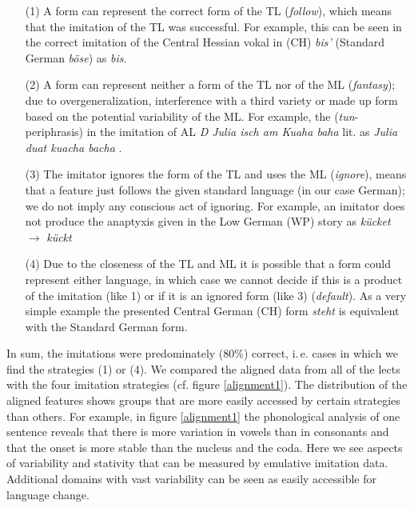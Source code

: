 \documentclass[output=paper]{LSP/langsci}
\begin{document}
\begin{itemize}
\item [(1)] A form can represent the correct form of the TL (\textit{follow}), which means that the imitation of the TL was successful.
 For example, this can be seen in the correct imitation of the Central Hessian vokal in (CH) \textit{bis’} (Standard German \textit{b\"ose})  as \textit{bis}.
 \item [(2)]  A form can represent neither a form of the TL nor of the ML (\textit{fantasy}); due to overgeneralization, interference with a third variety or made up form based on the potential variability of the ML. 
 For example, the  (\textit{tun}-periphrasis) in the imitation of AL \textit{D Julia isch am Kuaha baha} lit.  as \textit{Julia duat kuacha bacha} . 
  \item [(3)] The imitator ignores the form of the TL and uses the ML (\textit{ignore}), means that a feature just follows the given standard language (in our case German); we do not imply any conscious act of ignoring.
  For example, an imitator does not produce the anaptyxis given in the Low German (WP) story as \textit{k\"ucket} $\to$ \textit{k\"uckt}
   \item [(4)] Due to the closeness of the TL and ML it is possible that a form could represent either language, in which case we cannot decide if this is a product of the imitation (like 1) or if it is an ignored form (like 3) (\textit{default}). As a very simple example the presented Central German (CH) form \textit{steht}  is equivalent with the Standard German form.
 \end{itemize}
  
In sum, the imitations were predominately (80\%) correct, i.\,e. cases in which we find the strategies (1) or (4). We compared the aligned data from all of the lects with the four imitation strategies (cf. figure \ref{alignment1}). The distribution of the aligned features shows groups that are more easily accessed by certain strategies than others. For example, in figure \ref{alignment1} the phonological analysis of one sentence reveals that there is more variation in vowels than in consonants and that the onset is more stable than the nucleus and the coda. Here we see aspects of variability and stativity that can be measured by emulative imitation data. Additional domains with vast variability can be seen as easily accessible for language change.
\end{document}
